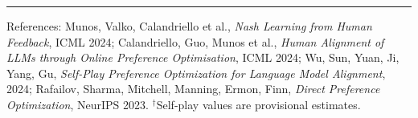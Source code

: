 \documentclass[final]{article}
\begin{document}
\vfill
{\color{linegray}\rule{\linewidth}{1.1pt}}
\vspace{0.35em}

{\fontsize{16}{19}\selectfont\color{textgray}
References: Munos, Valko, Calandriello et al., \textit{Nash Learning from Human Feedback}, ICML 2024; Calandriello, Guo, Munos et al., \textit{Human Alignment of LLMs through Online Preference Optimisation}, ICML 2024; Wu, Sun, Yuan, Ji, Yang, Gu, \textit{Self-Play Preference Optimization for Language Model Alignment}, 2024; Rafailov, Sharma, Mitchell, Manning, Ermon, Finn, \textit{Direct Preference Optimization}, NeurIPS 2023. $^\dagger$Self-play values are provisional estimates.
}
\end{document}

